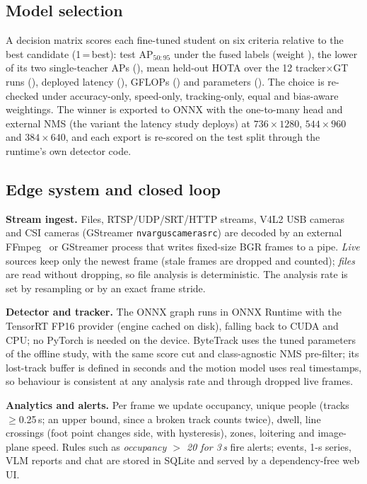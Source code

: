 \documentclass[conference]{IEEEtran}
\newcommand{\AP}{AP$_{50:95}$}
\begin{document}
\subsection{Model selection}
A decision matrix scores each fine-tuned student on six criteria relative to the best candidate (1\,=\,best):
test \AP{} under the fused labels (weight \MsWAp), the lower of its two single-teacher APs (\MsWBias), mean
held-out HOTA over the 12 tracker$\times$GT runs (\MsWHota), deployed latency (\MsWLat), GFLOPs (\MsWGflops) and
parameters (\MsWParams). The choice is re-checked under accuracy-only, speed-only, tracking-only, equal and
bias-aware weightings. The winner is exported to ONNX with the one-to-many head and external NMS (the variant
the latency study deploys) at $736{\times}1280$, $544{\times}960$ and $384{\times}640$, and each export is
re-scored on the test split through the runtime's own detector code.

\subsection{Edge system and closed loop}
\label{sec:edge}
\textbf{Stream ingest.} Files, RTSP/UDP/SRT/HTTP streams, V4L2 USB cameras and CSI cameras
(GStreamer \texttt{nvarguscamerasrc}) are decoded by an external FFmpeg~\cite{ffmpeg} or GStreamer process that
writes fixed-size BGR frames to a pipe. \emph{Live} sources keep only the newest frame (stale frames are dropped
and counted); \emph{files} are read without dropping, so file analysis is deterministic. The analysis rate is set
by resampling or by an exact frame stride.

\textbf{Detector and tracker.} The ONNX graph runs in ONNX Runtime with the TensorRT FP16 provider (engine cached
on disk), falling back to CUDA and CPU; no PyTorch is needed on the device. ByteTrack uses the tuned parameters
of the offline study, with the same score cut and class-agnostic NMS pre-filter; its lost-track buffer is defined
in seconds and the motion model uses real timestamps, so behaviour is consistent at any analysis rate and through
dropped live frames.

\textbf{Analytics and alerts.} Per frame we update occupancy, unique people (tracks $\geq$0.25\,s; an upper
bound, since a broken track counts twice), dwell, line crossings (foot point changes side, with hysteresis),
zones, loitering and image-plane speed. Rules such as \emph{occupancy $>$ 20 for 3\,s} fire alerts; events, 1-s
series, VLM reports and chat are stored in SQLite and served by a dependency-free web UI.
\end{document}

